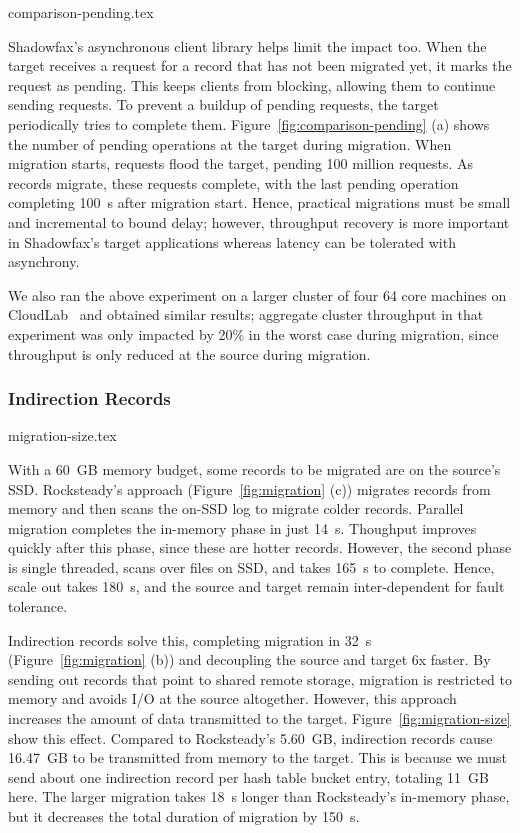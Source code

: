  {comparison-pending.tex}

Shadowfax's asynchronous client library helps limit the
impact too.
%
When the target receives a request for a record that has not been
migrated yet, it marks the request as pending.
%
This keeps clients from blocking, allowing them to
continue sending requests.
%
To prevent a buildup of pending requests, the target periodically tries to complete them.
%
Figure~\ref{fig:comparison-pending} (a) shows the number of pending operations at the
target during migration.
%
When migration starts, requests flood the target, pending 100 million requests.
%
As records migrate, these requests complete, with the last pending operation
completing 100~s after migration start.
%
Hence, practical migrations must be small and incremental to bound
delay; however, throughput recovery is more important in Shadowfax's target
applications whereas latency can be tolerated with asynchrony.

We also ran the above experiment on a larger cluster of four 64 core machines
on CloudLab~\cite{cloudlab} and obtained similar results; aggregate cluster
throughput in that experiment was only impacted by 20\% in the worst case
during migration, since throughput is only reduced at the source during
migration.

\subsubsection{Indirection Records}
\label{sec:eval:migration:indir}

 {migration-size.tex}

With a 60~GB memory budget, some records to be migrated are on the source's
SSD.
%
Rocksteady's approach (Figure~\ref{fig:migration} (c)) migrates records from
memory and then scans the on-SSD log to migrate colder records.
%
Parallel migration completes the in-memory phase in just 14~s.
%
Thoughput improves quickly after this phase, since these are hotter records.
%
However, the second phase is single threaded, scans over files on SSD,
and takes 165~s to complete.
%
Hence, scale out takes 180~s, and the source and target remain inter-dependent
for fault tolerance.

Indirection records solve this, completing migration in 32~s
(Figure~\ref{fig:migration} (b)) and decoupling the source and target 6x faster.
%
By sending out records that point to shared remote storage, migration
is restricted to memory and avoids I/O at the source altogether.
%
%
However, this approach increases the amount of data transmitted to the target.
%
Figure~\ref{fig:migration-size} show this effect.
%
Compared to Rocksteady's 5.60~GB, indirection records cause
16.47~GB to be transmitted from memory to the target.
%
This is because we must send about one indirection record per hash table bucket
entry, totaling 11~GB here.
%
%
The larger migration takes 18~s longer than Rocksteady's in-memory phase, but it
decreases the total duration of migration by 150~s.

